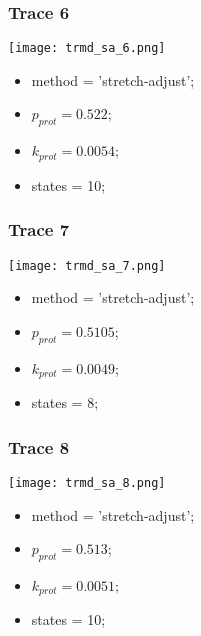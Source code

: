\subsubsection{Trace 6}
\begin{minipage}[c]{0.7\textwidth}
    \texttt{[image: trmd\_sa\_6.png]}
\end{minipage}
\hfill
\begin{minipage}[c]{0.45\textwidth}
    \begin{itemize}
        \item method = 'stretch-adjust';
        \item $p_{prot}=0.522$;
        \item $k_{prot}=0.0054$;
        \item states = 10;
    \end{itemize}
\end{minipage}

\subsubsection{Trace 7}
\begin{minipage}[c]{0.7\textwidth}
    \texttt{[image: trmd\_sa\_7.png]}
\end{minipage}
\hfill
\begin{minipage}[c]{0.45\textwidth}
    \begin{itemize}
        \item method = 'stretch-adjust';
        \item $p_{prot}=0.5105$;
        \item $k_{prot}=0.0049$;
        \item states = 8;
    \end{itemize}
\end{minipage}

\subsubsection{Trace 8}
\begin{minipage}[c]{0.7\textwidth}
    \texttt{[image: trmd\_sa\_8.png]}
\end{minipage}
\hfill
\begin{minipage}[c]{0.45\textwidth}
    \begin{itemize}
        \item method = 'stretch-adjust';
        \item $p_{prot}=0.513$;
        \item $k_{prot}=0.0051$;
        \item states = 10;
    \end{itemize}
\end{minipage}

